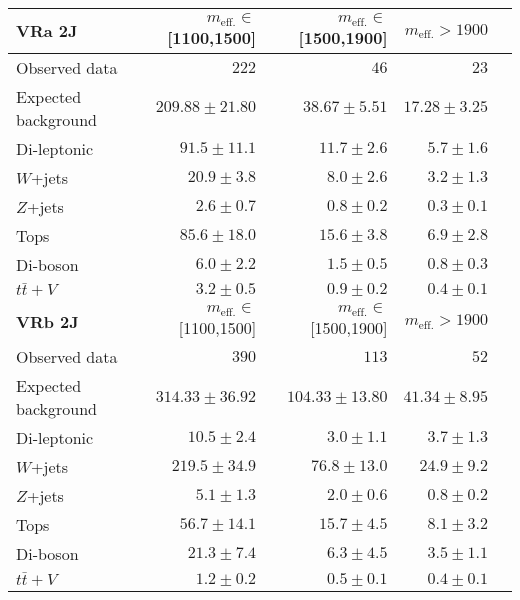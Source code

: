 \begin{table}
  \begin{center}
    \caption{ \label{tab::BGestimation::VRyields_2J}   }
    
    \begin{tabular*}{\textwidth}{@{\extracolsep{\fill}}lrrrr}
      \toprule
      \textbf{VRa 2J} & $m_{\mathrm{eff.}}\in$[1100,1500] & $m_{\mathrm{eff.}}\in$[1500,1900] & $m_{\mathrm{eff.}}>1900$ \\
      \midrule
      
Observed data          & $222$              & $46$              & $23$                    \\
\midrule
Expected background         & $209.88 \pm 21.80$          & $38.67 \pm 5.51$          & $17.28 \pm 3.25$              \\
\midrule
        Di-leptonic         & $91.5 \pm 11.1$          & $11.7 \pm 2.6$          & $5.7 \pm 1.6$              \\
        $W$+jets         & $20.9 \pm 3.8$          & $8.0 \pm 2.6$          & $3.2 \pm 1.3$              \\
        $Z$+jets         & $2.6 \pm 0.7$          & $0.8 \pm 0.2$          & $0.3 \pm 0.1$              \\
        Tops         & $85.6 \pm 18.0$          & $15.6 \pm 3.8$          & $6.9 \pm 2.8$              \\
        Di-boson         & $6.0 \pm 2.2$          & $1.5 \pm 0.5$          & $0.8 \pm 0.3$              \\
        $t\bar{t}+V$         & $3.2 \pm 0.5$          & $0.9 \pm 0.2$          & $0.4 \pm 0.1$              \\
\toprule
\textbf{VRb 2J} & $m_{\mathrm{eff.}}\in$[1100,1500] & $m_{\mathrm{eff.}}\in$[1500,1900] & $m_{\mathrm{eff.}}>1900$ \\
\midrule
Observed data          & $390$              & $113$              & $52$                    \\
\midrule
Expected background         & $314.33 \pm 36.92$          & $104.33 \pm 13.80$          & $41.34 \pm 8.95$              \\
\midrule
        Di-leptonic         & $10.5 \pm 2.4$          & $3.0 \pm 1.1$          & $3.7 \pm 1.3$              \\
        $W$+jets         & $219.5 \pm 34.9$          & $76.8 \pm 13.0$          & $24.9 \pm 9.2$              \\
        $Z$+jets         & $5.1 \pm 1.3$          & $2.0 \pm 0.6$          & $0.8 \pm 0.2$              \\
        Tops         & $56.7 \pm 14.1$          & $15.7 \pm 4.5$          & $8.1 \pm 3.2$              \\
        Di-boson         & $21.3 \pm 7.4$          & $6.3 \pm 4.5$          & $3.5 \pm 1.1$              \\
        $t\bar{t}+V$         & $1.2 \pm 0.2$          & $0.5 \pm 0.1$          & $0.4 \pm 0.1$              \\
        \bottomrule
        \end{tabular*}


\end{center}
\end{table}
